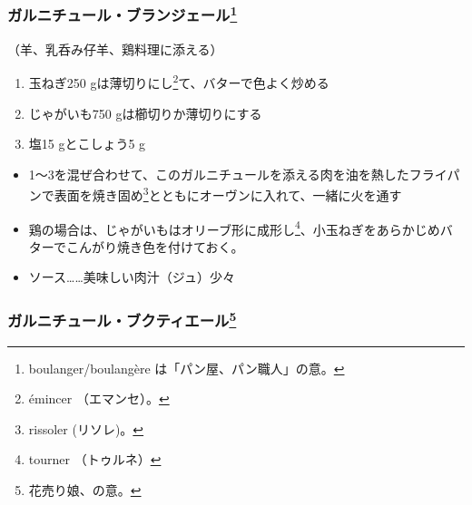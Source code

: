 \begin{recette}
\hypertarget{garniture-boulangere}{%
\subsubsection[ガルニチュール・ブランジェール]{\texorpdfstring{ガルニチュール・ブランジェール\footnote{boulanger/boulangère
  は「パン屋、パン職人」の意。}}{ガルニチュール・ブランジェール}}\label{garniture-boulangere}}



（羊、乳呑み仔羊、鶏料理に添える）

\begin{enumerate}
\def\labelenumi{\arabic{enumi}.}
\item
  玉ねぎ250 gは薄切りにし\footnote{émincer （エマンセ）。}て、バターで色よく炒める
\item
  じゃがいも750 gは櫛切りか薄切りにする
\item
  塩15 gとこしょう5 g
\end{enumerate}

\begin{itemize}
\item
  1〜3を混ぜ合わせて、このガルニチュールを添える肉を油を熱したフライパンで表面を焼き固め\footnote{rissoler
    (リソレ)。}とともにオーヴンに入れて、一緒に火を通す
\item
  鶏の場合は、じゃがいもはオリーブ形に成形し\footnote{tourner
    （トゥルネ）}、小玉ねぎをあらかじめバターでこんがり焼き色を付けておく。
\item
  ソース\ldots{}\ldots{}美味しい肉汁（ジュ）少々
\end{itemize}

\hypertarget{garniture-bouquetiere}{%
\subsubsection[ガルニチュール・ブクティエール]{\texorpdfstring{ガルニチュール・ブクティエール\footnote{花売り娘、の意。}}{ガルニチュール・ブクティエール}}\label{garniture-bouquetiere}}



\end{recette}
